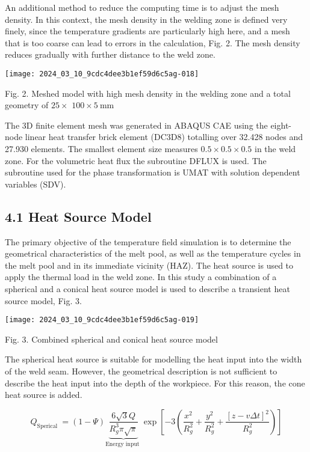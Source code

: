 \documentclass[10pt]{article}
\begin{document}
An additional method to reduce the computing time is to adjust the mesh density. In this context, the mesh density in the welding zone is defined very finely, since the temperature gradients are particularly high here, and a mesh that is too coarse can lead to errors in the calculation, Fig. 2. The mesh density reduces gradually with further distance to the weld zone.

\begin{center}
\texttt{[image: 2024\_03\_10\_9cdc4dee3b1ef59d6c5ag-018]}
\end{center}

Fig. 2. Meshed model with high mesh density in the welding zone and a total geometry of $25 \times$ $100 \times 5 \mathrm{~mm}$

The 3D finite element mesh was generated in ABAQUS CAE using the eight-node linear heat transfer brick element (DC3D8) totalling over 32.428 nodes and 27.930 elements. The smallest element size measures $0.5 \times 0.5 \times 0.5$ in the weld zone. For the volumetric heat flux the subroutine DFLUX is used. The subroutine used for the phase transformation is UMAT with solution dependent variables (SDV).

\subsection*{4.1 Heat Source Model}
The primary objective of the temperature field simulation is to determine the geometrical characteristics of the melt pool, as well as the temperature cycles in the melt pool and in its immediate vicinity (HAZ). The heat source is used to apply the thermal load in the weld zone. In this study a combination of a spherical and a conical heat source model is used to describe a transient heat source model, Fig. 3.

\begin{center}
\texttt{[image: 2024\_03\_10\_9cdc4dee3b1ef59d6c5ag-019]}
\end{center}

Fig. 3. Combined spherical and conical heat source model

The spherical heat source is suitable for modelling the heat input into the width of the weld seam. However, the geometrical description is not sufficient to describe the heat input into the depth of the workpiece. For this reason, the cone heat source is added.


\begin{equation*}
Q_{\text {Sperical }}=(1-\Psi) \underbrace{\frac{6 \sqrt{3} Q}{R_{g}^{3} \pi \sqrt{\pi}}}_{\text {Energy input }} \exp \left[-3\left(\frac{x^{2}}{R_{g}^{2}}+\frac{y^{2}}{R_{g}^{2}}+\frac{[z-v \Delta t]^{2}}{R_{g}^{2}}\right)\right] \tag{1}
\end{equation*}
\end{document}
